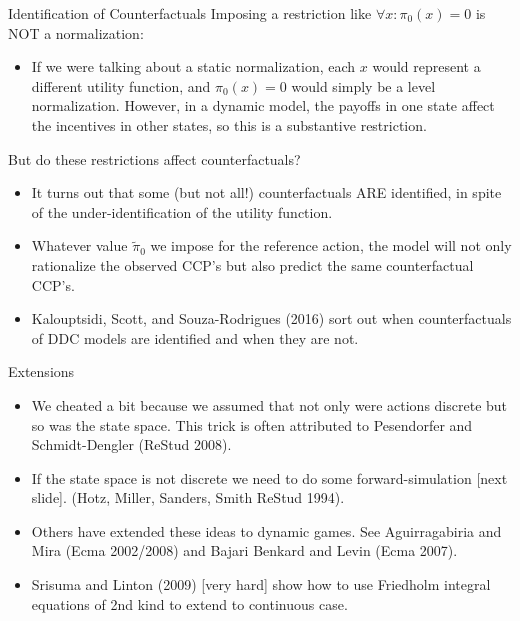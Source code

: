 \documentclass[xcolor=pdftex,dvipsnames,table,mathserif,aspectratio=169]{beamer}
\begin{document}
\begin{frame}{Identification of Counterfactuals}
Imposing a restriction like $\forall x:\pi_{0}\left(x\right)=0$
is NOT a normalization: 
\begin{itemize}
\item If we were talking
about a static normalization, each $x$ would represent a different
utility function, and $\pi_{0}\left(x\right)=0$ would simply be a
level normalization. However, in a dynamic model, the payoffs in one
state affect the incentives in other states, so this is a \alert{substantive
restriction.}
\end{itemize}
But do these restrictions affect counterfactuals?
\begin{itemize}
\item It turns out that some (but not all!) counterfactuals ARE identified, in spite of the
under-identification of the utility function. 
\item Whatever value
$\widetilde{\pi}_{0}$ we impose for the reference action, the model will not only
rationalize the observed CCP's but also predict \alert{the same counterfactual CCP's}.
\item Kalouptsidi, Scott, and Souza-Rodrigues (2016) sort out when counterfactuals
of DDC models are identified and when they are not.
\end{itemize}
\end{frame}

\begin{frame}{Extensions}
\begin{itemize}
\item We cheated a bit because we assumed that not only were actions discrete but so was the state space. This trick is often attributed to Pesendorfer and Schmidt-Dengler (ReStud 2008).
\item If the state space is not discrete we need to do some forward-simulation [next slide]. (Hotz, Miller, Sanders, Smith ReStud 1994).
\item Others have extended these ideas to \alert{dynamic games}. See Aguirragabiria and Mira (Ecma 2002/2008) and Bajari Benkard and Levin (Ecma 2007).
\item Srisuma and Linton (2009) [very hard] show how to use Friedholm integral equations of 2nd kind to extend to continuous case.
\end{itemize}
\end{frame}
\end{document}
